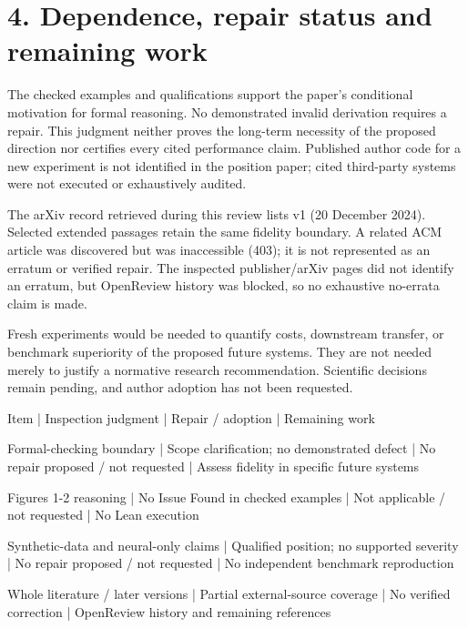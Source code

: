 \documentclass[10pt]{article}
\begin{document}
\section*{4. Dependence, repair status and remaining work}
The checked examples and qualifications support the paper’s conditional motivation for formal reasoning. No demonstrated invalid derivation requires a repair. This judgment neither proves the long-term necessity of the proposed direction nor certifies every cited performance claim. Published author code for a new experiment is not identified in the position paper; cited third-party systems were not executed or exhaustively audited.\par
The arXiv record retrieved during this review lists v1 (20 December 2024). Selected extended passages retain the same fidelity boundary. A related ACM article was discovered but was inaccessible (403); it is not represented as an erratum or verified repair. The inspected publisher/arXiv pages did not identify an erratum, but OpenReview history was blocked, so no exhaustive no-errata claim is made.\par
Fresh experiments would be needed to quantify costs, downstream transfer, or benchmark superiority of the proposed future systems. They are not needed merely to justify a normative research recommendation. Scientific decisions remain pending, and author adoption has not been requested.\par
Item | Inspection judgment | Repair / adoption | Remaining work\par
Formal-checking boundary | Scope clarification; no demonstrated defect | No repair proposed / not requested | Assess fidelity in specific future systems\par
Figures 1-2 reasoning | No Issue Found in checked examples | Not applicable / not requested | No Lean execution\par
Synthetic-data and neural-only claims | Qualified position; no supported severity | No repair proposed / not requested | No independent benchmark reproduction\par
Whole literature / later versions | Partial external-source coverage | No verified correction | OpenReview history and remaining references\par
\end{document}
